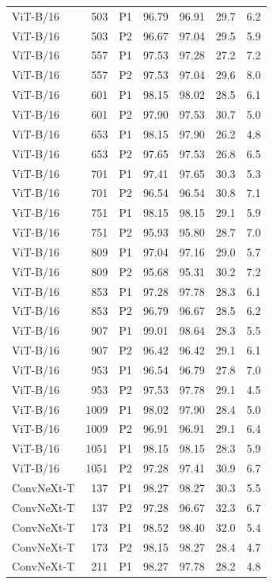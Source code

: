 {\begin{longtable}{lrlrrrr}
ViT-B/16 & 503 & P1 & 96.79 & 96.91 & 29.7 & 6.2 \\
ViT-B/16 & 503 & P2 & 96.67 & 97.04 & 29.5 & 5.9 \\
ViT-B/16 & 557 & P1 & 97.53 & 97.28 & 27.2 & 7.2 \\
ViT-B/16 & 557 & P2 & 97.53 & 97.04 & 29.6 & 8.0 \\
ViT-B/16 & 601 & P1 & 98.15 & 98.02 & 28.5 & 6.1 \\
ViT-B/16 & 601 & P2 & 97.90 & 97.53 & 30.7 & 5.0 \\
ViT-B/16 & 653 & P1 & 98.15 & 97.90 & 26.2 & 4.8 \\
ViT-B/16 & 653 & P2 & 97.65 & 97.53 & 26.8 & 6.5 \\
ViT-B/16 & 701 & P1 & 97.41 & 97.65 & 30.3 & 5.3 \\
ViT-B/16 & 701 & P2 & 96.54 & 96.54 & 30.8 & 7.1 \\
ViT-B/16 & 751 & P1 & 98.15 & 98.15 & 29.1 & 5.9 \\
ViT-B/16 & 751 & P2 & 95.93 & 95.80 & 28.7 & 7.0 \\
ViT-B/16 & 809 & P1 & 97.04 & 97.16 & 29.0 & 5.7 \\
ViT-B/16 & 809 & P2 & 95.68 & 95.31 & 30.2 & 7.2 \\
ViT-B/16 & 853 & P1 & 97.28 & 97.78 & 28.3 & 6.1 \\
ViT-B/16 & 853 & P2 & 96.79 & 96.67 & 28.5 & 6.2 \\
ViT-B/16 & 907 & P1 & 99.01 & 98.64 & 28.3 & 5.5 \\
ViT-B/16 & 907 & P2 & 96.42 & 96.42 & 29.1 & 6.1 \\
ViT-B/16 & 953 & P1 & 96.54 & 96.79 & 27.8 & 7.0 \\
ViT-B/16 & 953 & P2 & 97.53 & 97.78 & 29.1 & 4.5 \\
ViT-B/16 & 1009 & P1 & 98.02 & 97.90 & 28.4 & 5.0 \\
ViT-B/16 & 1009 & P2 & 96.91 & 96.91 & 29.1 & 6.4 \\
ViT-B/16 & 1051 & P1 & 98.15 & 98.15 & 28.3 & 5.9 \\
ViT-B/16 & 1051 & P2 & 97.28 & 97.41 & 30.9 & 6.7 \\
ConvNeXt-T & 137 & P1 & 98.27 & 98.27 & 30.3 & 5.5 \\
ConvNeXt-T & 137 & P2 & 97.28 & 96.67 & 32.3 & 6.7 \\
ConvNeXt-T & 173 & P1 & 98.52 & 98.40 & 32.0 & 5.4 \\
ConvNeXt-T & 173 & P2 & 98.15 & 98.27 & 28.4 & 4.7 \\
ConvNeXt-T & 211 & P1 & 98.27 & 97.78 & 28.2 & 4.8 \\

\end{longtable}}
